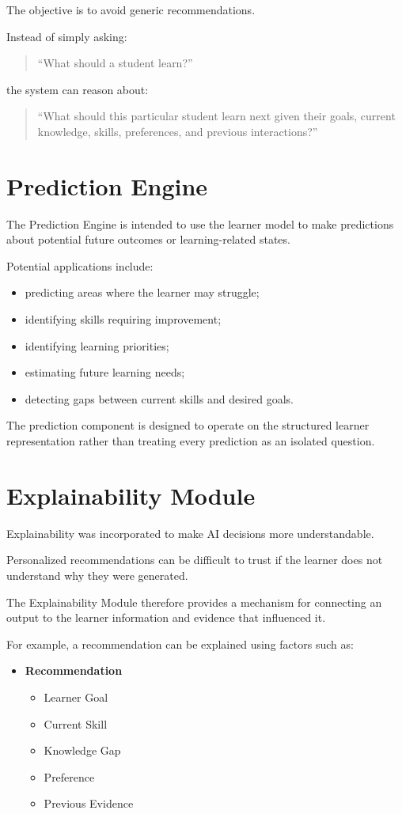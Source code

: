 \documentclass[12pt,a4paper]{article}
\begin{document}
The objective is to avoid generic recommendations.

Instead of simply asking:
\begin{quote}
``What should a student learn?''
\end{quote}
the system can reason about:
\begin{quote}
``What should this particular student learn next given their goals, current knowledge, skills, preferences, and previous interactions?''
\end{quote}

\section{Prediction Engine}
The Prediction Engine is intended to use the learner model to make predictions about potential future outcomes or learning-related states.

Potential applications include:
\begin{itemize}[noitemsep,topsep=2pt]
    \item predicting areas where the learner may struggle;
    \item identifying skills requiring improvement;
    \item identifying learning priorities;
    \item estimating future learning needs;
    \item detecting gaps between current skills and desired goals.
\end{itemize}

The prediction component is designed to operate on the structured learner representation rather than treating every prediction as an isolated question.

\section{Explainability Module}
Explainability was incorporated to make AI decisions more understandable.

Personalized recommendations can be difficult to trust if the learner does not understand why they were generated.

The Explainability Module therefore provides a mechanism for connecting an output to the learner information and evidence that influenced it.

For example, a recommendation can be explained using factors such as:
\begin{itemize}[noitemsep,topsep=2pt]
    \item[] \textbf{Recommendation}
    \begin{itemize}[noitemsep,topsep=1pt]
        \item[$\vdash$] Learner Goal
        \item[$\vdash$] Current Skill
        \item[$\vdash$] Knowledge Gap
        \item[$\vdash$] Preference
        \item[$\llcorner$] Previous Evidence
    \end{itemize}
\end{itemize}
\end{document}
